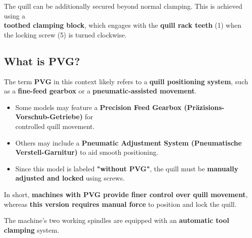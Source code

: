 \vspace{0.5cm}

The quill can be additionally secured beyond normal clamping.  
This is achieved using a\\ \textbf{toothed clamping block}, which engages with the \textbf{quill rack teeth} (1) when the locking screw (5) is turned clockwise.

\vspace{0.3cm}


\vspace{0.3cm}


\vspace{0.5cm}

\subsection{What is PVG?}

The term \textbf{PVG} in this context likely refers to a \textbf{quill positioning system}, such as a \textbf{fine-feed gearbox} or a \textbf{pneumatic-assisted movement}.

\begin{itemize}
    \item Some models may feature a \textbf{Precision Feed Gearbox (Präzisions-Vorschub-Getriebe)} for \\controlled quill movement.
    \item Others may include a \textbf{Pneumatic Adjustment System (Pneumatische Verstell-Garnitur)} to aid smooth positioning.
    \item Since this model is labeled \textbf{"without PVG"}, the quill must be \textbf{manually adjusted and locked} using screws.
\end{itemize}

In short, \textbf{machines with PVG provide finer control over quill movement}, whereas \textbf{this version requires manual force} to position and lock the quill.


\setcounter{section}{12}

The machine's two working spindles are equipped with an \textbf{automatic tool clamping} system.

